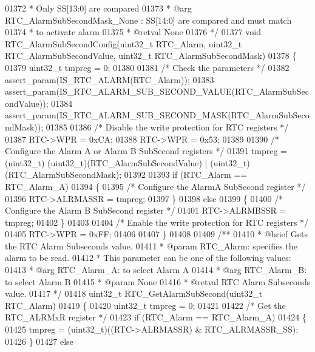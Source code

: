 \begin{DoxyCode}
01372 \textcolor{comment}{  *                                          Only SS[13:0] are compared}
01373 \textcolor{comment}{  *     @arg RTC\_AlarmSubSecondMask\_None   : SS[14:0] are compared and must match}
01374 \textcolor{comment}{  *                                          to activate alarm}
01375 \textcolor{comment}{  * @retval None}
01376 \textcolor{comment}{  */}
01377 \textcolor{keywordtype}{void} RTC_AlarmSubSecondConfig(uint32\_t RTC\_Alarm, uint32\_t RTC\_AlarmSubSecondValue, uint32\_t 
      RTC\_AlarmSubSecondMask)
01378 \{
01379   uint32\_t tmpreg = 0;
01380 
01381   \textcolor{comment}{/* Check the parameters */}
01382   assert_param(IS\_RTC\_ALARM(RTC\_Alarm));
01383   assert_param(IS\_RTC\_ALARM\_SUB\_SECOND\_VALUE(RTC\_AlarmSubSecondValue));
01384   assert_param(IS\_RTC\_ALARM\_SUB\_SECOND\_MASK(RTC\_AlarmSubSecondMask));
01385 
01386   \textcolor{comment}{/* Disable the write protection for RTC registers */}
01387   RTC->WPR = 0xCA;
01388   RTC->WPR = 0x53;
01389 
01390   \textcolor{comment}{/* Configure the Alarm A or Alarm B SubSecond registers */}
01391   tmpreg = (uint32\_t) (uint32\_t)(RTC\_AlarmSubSecondValue) | (uint32\_t)(RTC\_AlarmSubSecondMask);
01392 
01393   \textcolor{keywordflow}{if} (RTC\_Alarm == RTC_Alarm_A)
01394   \{
01395     \textcolor{comment}{/* Configure the AlarmA SubSecond register */}
01396     RTC->ALRMASSR = tmpreg;
01397   \}
01398   \textcolor{keywordflow}{else}
01399   \{
01400     \textcolor{comment}{/* Configure the Alarm B SubSecond register */}
01401     RTC->ALRMBSSR = tmpreg;
01402   \}
01403 
01404   \textcolor{comment}{/* Enable the write protection for RTC registers */}
01405   RTC->WPR = 0xFF;
01406 
01407 \}
01408 
01409 \textcolor{comment}{/**}
01410 \textcolor{comment}{  * @brief  Gets the RTC Alarm Subseconds value.}
01411 \textcolor{comment}{  * @param  RTC\_Alarm: specifies the alarm to be read.}
01412 \textcolor{comment}{  *   This parameter can be one of the following values:}
01413 \textcolor{comment}{  *     @arg RTC\_Alarm\_A: to select Alarm A}
01414 \textcolor{comment}{  *     @arg RTC\_Alarm\_B: to select Alarm B}
01415 \textcolor{comment}{  * @param  None}
01416 \textcolor{comment}{  * @retval RTC Alarm Subseconds value.}
01417 \textcolor{comment}{  */}
01418 uint32\_t RTC_GetAlarmSubSecond(uint32\_t RTC\_Alarm)
01419 \{
01420   uint32\_t tmpreg = 0;
01421 
01422   \textcolor{comment}{/* Get the RTC\_ALRMxR register */}
01423   \textcolor{keywordflow}{if} (RTC\_Alarm == RTC_Alarm_A)
01424   \{
01425     tmpreg = (uint32\_t)((RTC->ALRMASSR) & RTC_ALRMASSR_SS);
01426   \}
01427   \textcolor{keywordflow}{else}

\end{DoxyCode}
